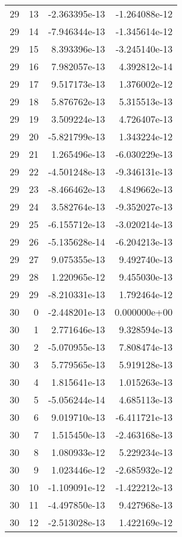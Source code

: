 \begin{tabular}{rrrr}
  29 &   13 & -2.363395e-13 & -1.264088e-12 \\
  29 &   14 & -7.946344e-13 & -1.345614e-12 \\
  29 &   15 &  8.393396e-13 & -3.245140e-13 \\
  29 &   16 &  7.982057e-13 &  4.392812e-14 \\
  29 &   17 &  9.517173e-13 &  1.376002e-12 \\
  29 &   18 &  5.876762e-13 &  5.315513e-13 \\
  29 &   19 &  3.509224e-13 &  4.726407e-13 \\
  29 &   20 & -5.821799e-13 &  1.343224e-12 \\
  29 &   21 &  1.265496e-13 & -6.030229e-13 \\
  29 &   22 & -4.501248e-13 & -9.346131e-13 \\
  29 &   23 & -8.466462e-13 &  4.849662e-13 \\
  29 &   24 &  3.582764e-13 & -9.352027e-13 \\
  29 &   25 & -6.155712e-13 & -3.020214e-13 \\
  29 &   26 & -5.135628e-14 & -6.204213e-13 \\
  29 &   27 &  9.075355e-13 &  9.492740e-13 \\
  29 &   28 &  1.220965e-12 &  9.455030e-13 \\
  29 &   29 & -8.210331e-13 &  1.792464e-12 \\
  30 &    0 & -2.448201e-13 &  0.000000e+00 \\
  30 &    1 &  2.771646e-13 &  9.328594e-13 \\
  30 &    2 & -5.070955e-13 &  7.808474e-13 \\
  30 &    3 &  5.779565e-13 &  5.919128e-13 \\
  30 &    4 &  1.815641e-13 &  1.015263e-13 \\
  30 &    5 & -5.056244e-14 &  4.685113e-13 \\
  30 &    6 &  9.019710e-13 & -6.411721e-13 \\
  30 &    7 &  1.515450e-13 & -2.463168e-13 \\
  30 &    8 &  1.080933e-12 &  5.229234e-13 \\
  30 &    9 &  1.023446e-12 & -2.685932e-12 \\
  30 &   10 & -1.109091e-12 & -1.422212e-13 \\
  30 &   11 & -4.497850e-13 &  9.427968e-13 \\
  30 &   12 & -2.513028e-13 &  1.422169e-12 \\

\end{tabular}
